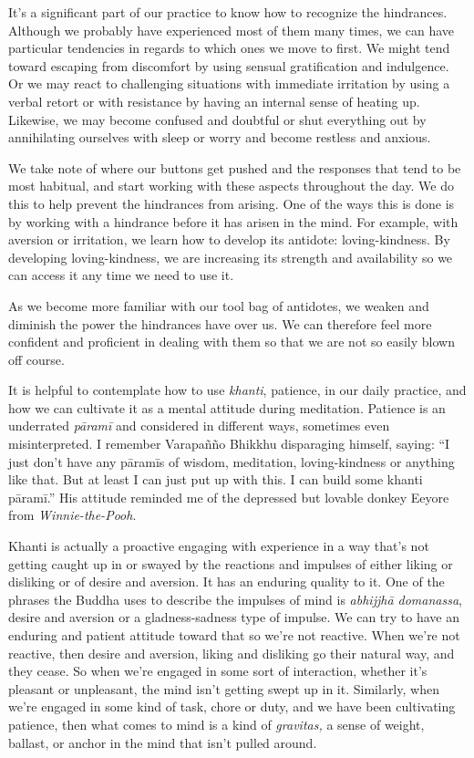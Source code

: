 It's a significant part of our practice to know how to recognize the 
hindrances. Although we probably have experienced most of them many 
times, we can have particular tendencies in regards to which ones we 
move to first. We might tend toward escaping from discomfort by using 
sensual gratification and indulgence. Or we may react to challenging 
situations with immediate irritation by using a verbal retort or with 
resistance by having an internal sense of heating up. Likewise, we may 
become confused and doubtful or shut everything out by annihilating 
ourselves with sleep or worry and become restless and anxious.

We take note of where our buttons get pushed and the responses that 
tend to be most habitual, and start working with these aspects 
throughout the day. We do this to help prevent the hindrances from 
arising. One of the ways this is done is by working with a hindrance 
before it has arisen in the mind. For example, with aversion or 
irritation, we learn how to develop its antidote: loving-kindness. By 
developing loving-kindness, we are increasing its strength and 
availability so we can access it any time we need to use it.

As we become more familiar with our tool bag of antidotes, we weaken 
and diminish the power the hindrances have over us. We can therefore 
feel more confident and proficient in dealing with them so that we are 
not so easily blown off course.


It is helpful to contemplate how to use \emph{khanti}, patience, in our 
daily practice, and how we can cultivate it as a mental attitude during 
meditation. Patience is an underrated \emph{pāramī} and considered in 
different ways, sometimes even misinterpreted. I remember Varapañño 
Bhikkhu disparaging himself, saying: ``I just don't have any pāramīs 
of wisdom, meditation, loving-kindness or anything like that. But at 
least I can just put up with this. I can build some khanti pāramī.'' 
His attitude reminded me of the depressed but lovable donkey Eeyore 
from \emph{Winnie-the-Pooh}.

Khanti is actually a proactive engaging with experience in a way that's 
not getting caught up in or swayed by the reactions and impulses of 
either liking or disliking or of desire and aversion. It has an 
enduring quality to it. One of the phrases the Buddha uses to describe 
the impulses of mind is \emph{abhijjhā domanassa}, desire and aversion 
or a gladness-sadness type of impulse. We can try to have an enduring 
and patient attitude toward that so we're not reactive. When we're not 
reactive, then desire and aversion, liking and disliking go their 
natural way, and they cease. So when we're engaged in some sort of 
interaction, whether it's pleasant or unpleasant, the mind isn't 
getting swept up in it. Similarly, when we're engaged in some kind of 
task, chore or duty, and we have been cultivating patience, then what 
comes to mind is a kind of \emph{gravitas,} a sense of weight, ballast, 
or anchor in the mind that isn't pulled around.

